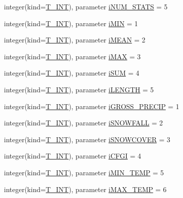\begin{DoxyCompactItemize}
\item 
integer(kind=\hyperlink{namespacetest_a6f91ebd89b58cfcc5da99faed9385c1e}{T\_\-INT}), parameter \hyperlink{namespacetest_a2f5f426220fe1778999fe65b3c4def48}{iNUM\_\-STATS} = 5
\item 
integer(kind=\hyperlink{namespacetest_a6f91ebd89b58cfcc5da99faed9385c1e}{T\_\-INT}), parameter \hyperlink{namespacetest_a5e4e66d4853b73ddeb16d8ec6d2f96ba}{iMIN} = 1
\item 
integer(kind=\hyperlink{namespacetest_a6f91ebd89b58cfcc5da99faed9385c1e}{T\_\-INT}), parameter \hyperlink{namespacetest_ad573fcda72b69e8d829aaecc8702e369}{iMEAN} = 2
\item 
integer(kind=\hyperlink{namespacetest_a6f91ebd89b58cfcc5da99faed9385c1e}{T\_\-INT}), parameter \hyperlink{namespacetest_a15112155670f39cbf96fd72e177d71d3}{iMAX} = 3
\item 
integer(kind=\hyperlink{namespacetest_a6f91ebd89b58cfcc5da99faed9385c1e}{T\_\-INT}), parameter \hyperlink{namespacetest_acd0b0aa61e54ac17016b3ecb8846d4fb}{iSUM} = 4
\item 
integer(kind=\hyperlink{namespacetest_a6f91ebd89b58cfcc5da99faed9385c1e}{T\_\-INT}), parameter \hyperlink{namespacetest_ab20904e5281139e17cfa93af209e2996}{iLENGTH} = 5
\item 
integer(kind=\hyperlink{namespacetest_a6f91ebd89b58cfcc5da99faed9385c1e}{T\_\-INT}), parameter \hyperlink{namespacetest_a54d657be83774d91310d0ad6ab3d773f}{iGROSS\_\-PRECIP} = 1
\item 
integer(kind=\hyperlink{namespacetest_a6f91ebd89b58cfcc5da99faed9385c1e}{T\_\-INT}), parameter \hyperlink{namespacetest_a406398e83d202c4d496adcc1af5d6fb3}{iSNOWFALL} = 2
\item 
integer(kind=\hyperlink{namespacetest_a6f91ebd89b58cfcc5da99faed9385c1e}{T\_\-INT}), parameter \hyperlink{namespacetest_a0b1f3cd89bcb139c712a36ad034b58ea}{iSNOWCOVER} = 3
\item 
integer(kind=\hyperlink{namespacetest_a6f91ebd89b58cfcc5da99faed9385c1e}{T\_\-INT}), parameter \hyperlink{namespacetest_a03bfe6fa65e697740874c9436f435dfe}{iCFGI} = 4
\item 
integer(kind=\hyperlink{namespacetest_a6f91ebd89b58cfcc5da99faed9385c1e}{T\_\-INT}), parameter \hyperlink{namespacetest_adbc94b4c943a3bf4995dff5b8d7ba7c3}{iMIN\_\-TEMP} = 5
\item 
integer(kind=\hyperlink{namespacetest_a6f91ebd89b58cfcc5da99faed9385c1e}{T\_\-INT}), parameter \hyperlink{namespacetest_ad4e8b276391e3cbc8cc135dfa7b10971}{iMAX\_\-TEMP} = 6
\item 

\end{DoxyCompactItemize}
